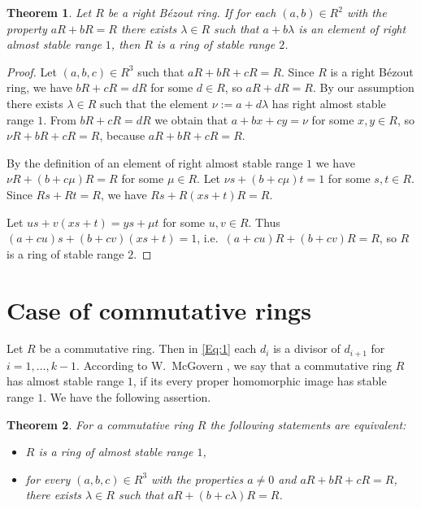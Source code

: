 \documentclass[12pt,a4paper, reqno]{amsart}
\newtheorem{theorem}{Theorem}
\begin{document}
\begin{theorem}\label{T:3}
Let $R$ be a right B\'ezout ring.  If for each  $(a,b)\in R^2$ with the property $aR+bR=R$ there exists
$\lambda\in R$ such that $a+b\lambda$ is an element of right almost stable range $1$, then $R$ is a ring of stable range $2$.
\end{theorem}

\begin{proof}
Let $(a,b,c)\in R^3$ such that $aR+bR+cR=R$. Since $R$ is a right B\'ezout ring, we have $bR+cR=dR$ for some  $d\in R$, so $aR+dR=R$. By our assumption there exists $\lambda\in R$ such that the element  $\nu:=a+d\lambda$  has  right almost stable range $1$.   From  $bR+cR=dR$ we obtain  that $a+bx+cy=\nu$ for some $x,y\in R$, so $\nu R+bR+cR=R$, because   $aR+bR+cR=R$.


By the  definition of an element of   right almost stable range $1$ we have $\nu R+(b+c\mu)R=R$ for some $\mu\in R$. Let $\nu s+(b+c\mu)t=1$ for some $s, t\in R$. Since $Rs+Rt=R$, we have
$Rs+R(xs+t)R=R$.

 Let $us+v(xs+t)=ys+\mu t$ for some $u,v\in R$. Thus
$(a+cu)s+(b+cv)(xs+t)=1$,
i.e.~$(a+cu)R+(b+cv)R=R$, so  $R$ is a ring of stable range $2$.
\end{proof}

\section{Case of commutative rings}

Let $R$ be a commutative  ring. Then in \eqref{Eq:1} each   $d_{i}$ is a divisor of $d_{i+1}$  for $i=1,\ldots, k-1$.  According to
W.~McGovern  \cite[p.\,393]{4-mcGovern}, we say that a commutative ring $R$ has  almost stable range $1$, if its   every proper homomorphic image has stable range $1$. We have   the following assertion.

\begin{theorem}\label{T:4}
For  a commutative ring $R$ the following statements are equivalent:
\begin{itemize}
      \item[(i)] $R$ is a ring of almost stable range $1$,
      \item[(ii)] for every $(a,b,c)\in R^3$ with the properties  $a\ne0$ and $aR+bR+cR=R$,  there exists  $\lambda\in R$ such that $aR+(b+c\lambda)R=R$.
    \end{itemize}
\end{theorem}
\end{document}
